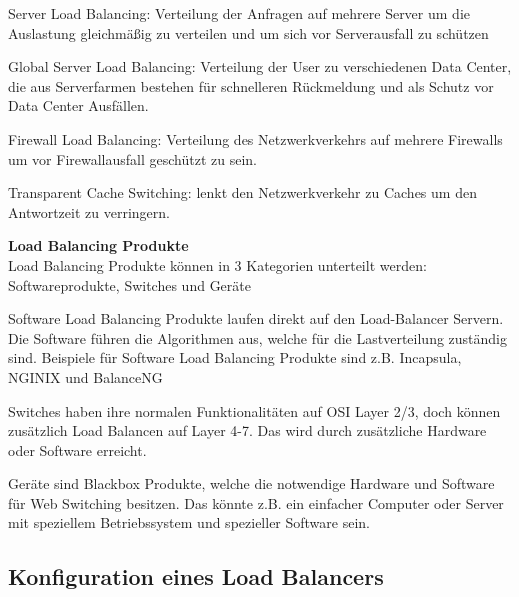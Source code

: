 Server Load Balancing: Verteilung der Anfragen auf mehrere Server um die Auslastung gleichmäßig zu verteilen und um sich vor Serverausfall zu schützen

Global Server Load Balancing: Verteilung der User zu verschiedenen Data Center, die aus Serverfarmen bestehen für schnelleren Rückmeldung und als Schutz vor Data Center Ausfällen.

Firewall Load Balancing: Verteilung des Netzwerkverkehrs auf mehrere Firewalls um vor Firewallausfall geschützt zu sein.

Transparent Cache Switching: lenkt den Netzwerkverkehr zu Caches um den Antwortzeit zu verringern. 

\textbf{Load Balancing Produkte} \\

Load Balancing Produkte können in 3 Kategorien unterteilt werden: Softwareprodukte,  Switches und  Geräte

Software Load Balancing Produkte laufen direkt auf den Load-Balancer Servern. Die Software führen die Algorithmen aus, welche für die Lastverteilung zuständig sind. Beispiele für Software Load Balancing Produkte sind z.B. Incapsula, NGINIX und BalanceNG 

Switches haben ihre normalen Funktionalitäten auf OSI Layer 2/3, doch können zusätzlich Load Balancen auf Layer 4-7. Das wird durch zusätzliche Hardware oder Software erreicht.  

Geräte sind Blackbox Produkte, welche die notwendige Hardware und Software für Web Switching besitzen. Das könnte z.B. ein einfacher Computer oder Server mit speziellem Betriebssystem und spezieller Software sein. \cite{LoadBalancing2}

\subsection{Konfiguration eines Load Balancers}
\label{sec:Konfiguration eines Load Balancers}

